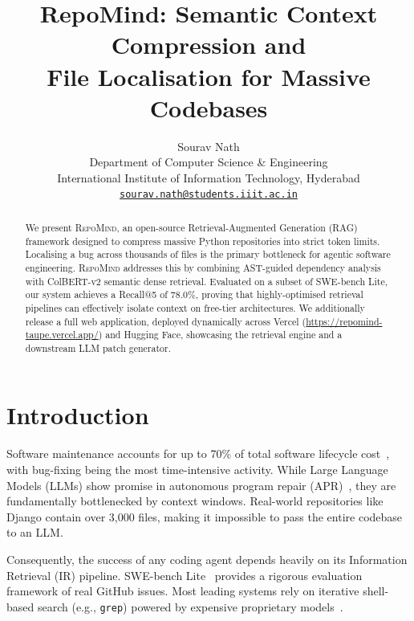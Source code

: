 \documentclass[11pt]{article}
\title{\textbf{RepoMind}: Semantic Context Compression and\\
       File Localisation for Massive Codebases}
\author{
  Sourav Nath \\
  Department of Computer Science \& Engineering \\
  International Institute of Information Technology, Hyderabad \\
  \texttt{\href{mailto:sourav.nath@students.iiit.ac.in}{sourav.nath@students.iiit.ac.in}}
}
\begin{document}
\maketitle

\begin{abstract}
We present \textsc{RepoMind}, an open-source Retrieval-Augmented Generation (RAG) framework designed to compress massive Python repositories into strict token limits. Localising a bug across thousands of files is the primary bottleneck for agentic software engineering. \textsc{RepoMind} addresses this by combining AST-guided dependency analysis with ColBERT-v2 semantic dense retrieval. Evaluated on a subset of SWE-bench Lite, our system achieves a Recall@5 of 78.0\%, proving that highly-optimised retrieval pipelines can effectively isolate context on free-tier architectures. We additionally release a full web application, deployed dynamically across Vercel (\url{https://repomind-taupe.vercel.app/}) and Hugging Face, showcasing the retrieval engine and a downstream LLM patch generator.
\end{abstract}

\section{Introduction}

Software maintenance accounts for up to 70\% of total software lifecycle
cost~\cite{pigoski1996practical}, with bug-fixing being the most
time-intensive activity. While Large Language Models (LLMs) show promise in
autonomous program repair (APR)~\cite{fan2023automated}, they are fundamentally
bottlenecked by context windows. Real-world repositories like Django contain
over 3,000 files, making it impossible to pass the entire codebase to an LLM.

Consequently, the success of any coding agent depends heavily on its Information
Retrieval (IR) pipeline. SWE-bench Lite~\cite{jimenez2024swebench} provides a
rigorous evaluation framework of real GitHub issues. Most leading systems rely
on iterative shell-based search (e.g., \texttt{grep}) powered by expensive
proprietary models~\cite{yang2024sweagent}.
\end{document}
